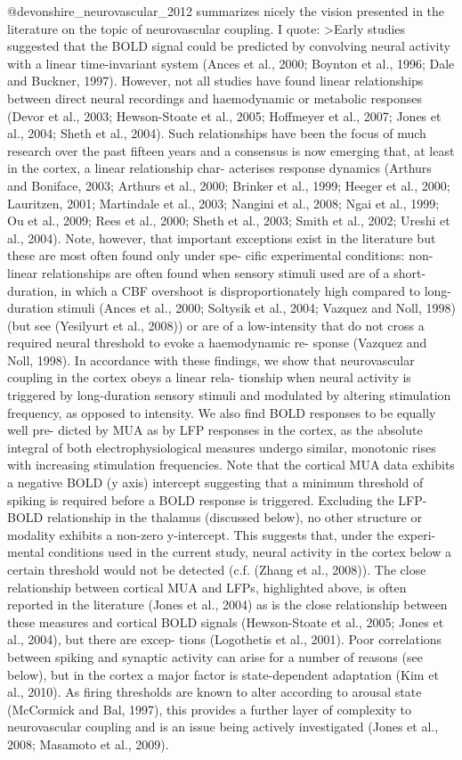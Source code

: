 @devonshire_neurovascular_2012 summarizes nicely the vision presented in the literature on the topic of neurovascular coupling. I quote:
>Early studies suggested that the BOLD signal could be predicted by
convolving neural activity with a linear time-invariant system (Ances
et al., 2000; Boynton et al., 1996; Dale and Buckner, 1997). However,
not all studies have found linear relationships between direct neural
recordings and haemodynamic or metabolic responses (Devor et al.,
2003; Hewson-Stoate et al., 2005; Hoffmeyer et al., 2007; Jones
et al., 2004; Sheth et al., 2004). Such relationships have been the
focus of much research over the past fifteen years and a consensus
is now emerging that, at least in the cortex, a linear relationship char-
acterises response dynamics (Arthurs and Boniface, 2003; Arthurs
et al., 2000; Brinker et al., 1999; Heeger et al., 2000; Lauritzen,
2001; Martindale et al., 2003; Nangini et al., 2008; Ngai et al., 1999;
Ou et al., 2009; Rees et al., 2000; Sheth et al., 2003; Smith et al.,
2002; Ureshi et al., 2004). Note, however, that important exceptions
exist in the literature but these are most often found only under spe-
cific experimental conditions: non-linear relationships are often
found when sensory stimuli used are of a short-duration, in which a
CBF overshoot is disproportionately high compared to long-duration
stimuli (Ances et al., 2000; Soltysik et al., 2004; Vazquez and Noll,
1998) (but see (Yesilyurt et al., 2008)) or are of a low-intensity that
do not cross a required neural threshold to evoke a haemodynamic re-
sponse (Vazquez and Noll, 1998). In accordance with these findings,
we show that neurovascular coupling in the cortex obeys a linear rela-
tionship when neural activity is triggered by long-duration sensory
stimuli and modulated by altering stimulation frequency, as opposed
to intensity. We also find BOLD responses to be equally well pre-
dicted by MUA as by LFP responses in the cortex, as the absolute
integral of both electrophysiological measures undergo similar,
monotonic rises with increasing stimulation frequencies. Note that
the cortical MUA data exhibits a negative BOLD (y axis) intercept
suggesting that a minimum threshold of spiking is required before
a BOLD response is triggered. Excluding the LFP-BOLD relationship
in the thalamus (discussed below), no other structure or modality
exhibits a non-zero y-intercept. This suggests that, under the experi-
mental conditions used in the current study, neural activity in the
cortex below a certain threshold would not be detected (c.f. (Zhang
et al., 2008)).
The close relationship between cortical MUA and LFPs, highlighted
above, is often reported in the literature (Jones et al., 2004) as is the
close relationship between these measures and cortical BOLD signals
(Hewson-Stoate et al., 2005; Jones et al., 2004), but there are excep-
tions (Logothetis et al., 2001). Poor correlations between spiking
and synaptic activity can arise for a number of reasons (see below),
but in the cortex a major factor is state-dependent adaptation (Kim
et al., 2010). As firing thresholds are known to alter according to
arousal state (McCormick and Bal, 1997), this provides a further
layer of complexity to neurovascular coupling and is an issue being
actively investigated (Jones et al., 2008; Masamoto et al., 2009).

